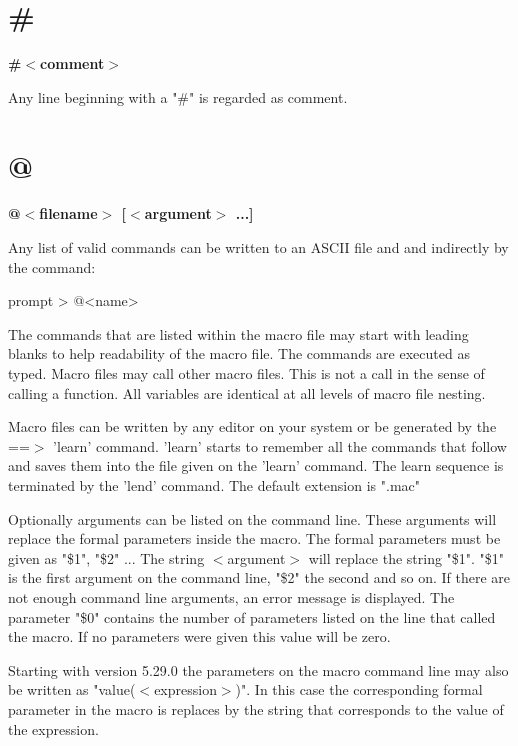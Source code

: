 \section{\#}
{\bf \#$ <$comment$> $ \par }
\par
\vspace{3pt}
Any line beginning with a "\#" is regarded as comment. 
\section{@}
{\bf @$ <$filename$> $ [$ <$argument$> $ ...] \par }
\par
\vspace{3pt}
Any list of valid commands can be written to an ASCII file and 
and indirectly by the command: 
\par
\begin{MacVerbatim}
prompt > @<name>
\end{MacVerbatim}
The commands that are listed within the macro file 
may start with leading blanks to help readability of 
the macro file. The commands are executed as typed. 
Macro files may call other macro files. This is not a call in 
the sense of calling a function. 
All variables are identical at all levels of macro file nesting. 
\par
Macro files can be written by any editor on your 
system or be generated by the ==$> $ 'learn' command. 'learn' starts to 
remember all the commands that follow and saves them into the file 
given on the 'learn' command. The learn sequence is terminated by 
the 'lend' command. The default extension is ".mac" 
\par
Optionally arguments can be listed on the command line. These arguments 
will replace the formal parameters inside the macro. The formal 
parameters must be given as "\$1", "\$2" ... The string $ <$argument$> $ will 
replace the string "\$1". "\$1" is the first argument on the command line, 
"\$2" the second and so on. If there are not enough command line arguments, 
an error message is displayed. 
The parameter "\$0" contains the number of parameters listed on the line 
that called the macro. If no parameters were given this value will be 
zero. 
\par
Starting with version 5.29.0 the parameters on the macro command line 
may also be written as "value($ <$expression$> $)". In this case the 
corresponding formal parameter in the macro is replaces by the 
string that corresponds to the value of the expression. 
